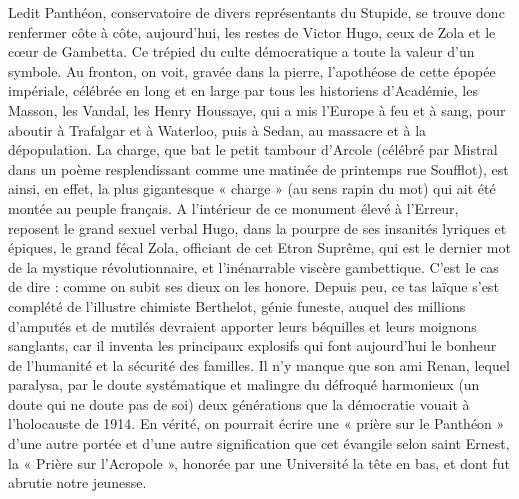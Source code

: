 \documentclass[french,twoside]{book} %
\begin{document}
Ledit Panthéon, conservatoire de divers représentants du Stupide, se trouve donc renfermer côte à côte, aujourd’hui, les restes de Victor Hugo, ceux de Zola et le cœur de Gambetta. Ce trépied du culte démocratique a toute la valeur d’un symbole. Au fronton, on voit, gravée dans la pierre, l’apothéose de cette épopée impériale, célébrée en long et en large par tous les historiens d’Académie, les Masson, les Vandal, les Henry Houssaye, qui a mis l’Europe à feu et à sang, pour aboutir à Trafalgar et à Waterloo, puis à Sedan, au massacre et à la dépopulation. La charge, que bat le petit tambour d’Arcole (célébré par Mistral dans un poème resplendissant comme une matinée de printemps rue Soufflot), est ainsi, en effet, la plus gigantesque « charge » (au sens rapin du mot) qui ait été montée au peuple français. A l’intérieur de ce monument élevé à l’Erreur, reposent le grand sexuel verbal Hugo, dans la pourpre de ses insanités lyriques et épiques, le grand fécal Zola, officiant de cet Etron Suprême, qui est le dernier mot de la mystique révolutionnaire, et l’inénarrable viscère gambettique. C’est le cas de dire : comme on subit ses dieux on les honore. Depuis peu, ce tas laïque s’est complété de l’illustre chimiste Berthelot, génie funeste, auquel des millions d’amputés et de mutilés devraient apporter leurs béquilles et leurs moignons sanglants, car il inventa les principaux explosifs qui font aujourd’hui le bonheur de l’humanité et la sécurité des familles. Il n’y manque que son ami Renan, lequel paralysa, par le doute systématique et malingre du défroqué harmonieux (un doute qui ne doute pas de soi) deux générations que la démocratie vouait à l’holocauste de 1914. En vérité, on pourrait écrire une « prière sur le Panthéon » d’une autre portée et d’une autre signification que cet évangile selon saint Ernest, la « Prière sur l’Acropole », honorée par une Université la tête en bas, et dont fut abrutie notre jeunesse.\par
\end{document}
